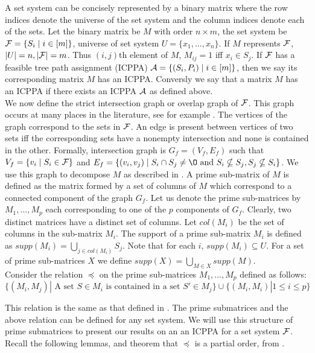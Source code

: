\documentclass{llncs}
\def\cA{{\cal A}}
\def\cF{{\cal F}}
\begin{document}
\noindent
A set system can be concisely represented by a binary matrix where the
row indices denote the universe of the set system and the column
indices denote each of the sets. Let the binary matrix be $M$ with
order $n \times m$, the set system be $\cF = \{S_i \mid i \in [m]\}$,
universe of set system $U = \{x_1, \dots ,x_n\}$. If $M$ represents $\cF$, $|U| = n, |\cF| =
m$. Thus $(i,j)$th element of $M$, $M_{ij} = 1$ iff $x_i \in S_j$. If $\cF$ has a feasible tree path assignment (ICPPA) $\cA =
\{(S_i,P_i) \mid i \in [m]\}$, then we
say its corresponding matrix $M$ has an ICPPA. Conversly
we say that a matrix $M$ has an ICPPA if there exists an ICPPA $\cA$ as defined
above.\\
\noindent
We now define the strict intersection graph or overlap graph of $\cF$. This graph occurs at many
places in the literature, see for example \cite{kklv10, wlh02, nsnrs09}.  The vertices of the graph
correspond to the sets in $\cF$.  An edge is present between vertices of two sets iff the
corresponding sets have a nonempty intersection and none is contained
in the other. Formally, intersection graph is $G_f = (V_f, E_f)$ such
that $V_f = \{v_i \mid S_i \in \cF\}$ and $E_f = \{(v_i, v_j) \mid S_i
\cap S_j \ne \O \text{ and }S_i \nsubseteq S_j, S_j \nsubseteq S_i
\}$.  We use this graph to decompose $M$ as described in \cite{wlh02,nsnrs09}.  
A prime sub-matrix of $M$ is defined as the
matrix formed by a set of columns of $M$ which correspond to a
connected component of the graph $G_f$.  Let us denote the prime
sub-matrices by $M_1,\ldots,M_p$ each corresponding to one of the $p$
components of $G_f$. Clearly, two distinct matrices have
a distinct set of columns.  Let $col(M_i)$ be the set of columns in
the sub-matrix $M_i$.  The support
of a prime sub-matrix $M_i$ is defined as $supp(M_i) = \displaystyle \bigcup_{j \in  col(M_i)}S_j$. 
Note that for each $i$, $supp(M_i) \subseteq
U$.  For a set of prime sub-matrices $X$ we define
$supp(X) = \displaystyle \bigcup_{M \in X} supp(M)$. \\


\noindent
Consider the relation
$\preccurlyeq$ on the prime sub-matrices $M_1, \ldots, M_p$ defined as
follows: 
\begin{equation} 
\nonumber \{(M_i,M_j) | \mbox{ A set } S \in
  M_i \mbox{ is contained in a set } S' \in M_j\} \cup \{(M_i,M_i) | 1
  \leq i \leq p\} 
\end{equation}

\noindent
This relation is the same as that defined in \cite{nsnrs09}. The prime submatrices and the above relation can be defined for
any set system. We will use this structure of prime submatrices to present our results on an 
an ICPPA for a set system $\cF$. Recall the following lemmas, and theorem that $\preccurlyeq$ is a partial order, 
from \cite{nsnrs09}.
\end{document}
